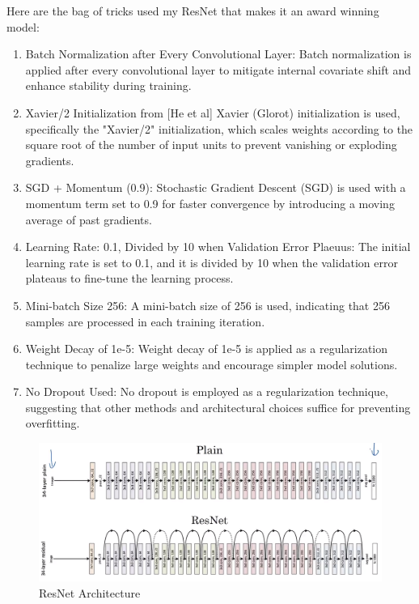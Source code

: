 \documentclass{report}
\begin{document}
Here are the bag of tricks used my ResNet that makes it an award winning model:
\begin{enumerate}
\item Batch Normalization after Every Convolutional Layer: Batch normalization is applied after every convolutional layer to mitigate internal covariate shift and enhance stability during training.

\item Xavier/2 Initialization from [He et al] Xavier (Glorot) initialization is used, specifically the "Xavier/2" initialization, which scales weights according to the square root of the number of input units to prevent vanishing or exploding gradients.

\item SGD + Momentum (0.9): Stochastic Gradient Descent (SGD) is used with a momentum term set to 0.9 for faster convergence by introducing a moving average of past gradients.

\item Learning Rate: 0.1, Divided by 10 when Validation Error Plaeuus: The initial learning rate is set to 0.1, and it is divided by 10 when the validation error plateaus to fine-tune the learning process.

\item Mini-batch Size 256: A mini-batch size of 256 is used, indicating that 256 samples are processed in each training iteration.

\item Weight Decay of 1e-5: Weight decay of 1e-5 is applied as a regularization technique to penalize large weights and encourage simpler model solutions.

\item No Dropout Used: No dropout is employed as a regularization technique, suggesting that other methods and architectural choices suffice for preventing overfitting.
\end{enumerate}

\begin{figure}[ht]
	\includegraphics[width=350pt]{54}
	\centering
	\caption{ResNet Architecture}
\end{figure}
\end{document}
